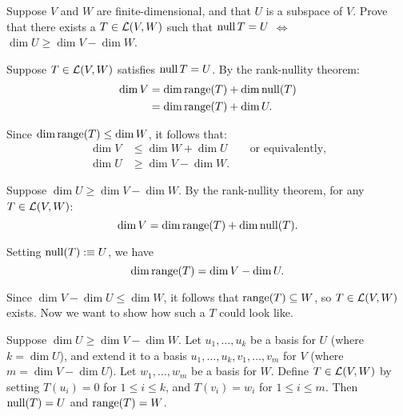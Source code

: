 \begin{xrcs}
  Suppose $V$ and $W$ are finite-dimensional, and that $U$ is a subspace of $V$. Prove that there exists a $T \in \mathcal{L}(V,W)$ such that $\operatorname{null} T = U$ $\iff$ $\dim U \geq \dim V - \dim W$.

  \begin{xprf}
    \Rightarrowdirection Suppose $T \in \mathcal{L}(V,W)$ satisfies $\operatorname{null} T = U$. By the rank-nullity theorem:
    \begin{equation}
      \begin{aligned}
        \dim V &= \dim \operatorname{range}(T) + \dim \operatorname{null}(T) \\
        &= \dim \operatorname{range}(T) + \dim U.
      \end{aligned}
    \end{equation}

    Since $\dim \operatorname{range}(T) \leq \dim W$, it follows that:
    \begin{equation}
      \begin{aligned}
        \dim V &\leq \dim W + \dim U \qquad \text{or equivalently,}  \\
        \dim U &\geq \dim V - \dim W.
      \end{aligned}
    \end{equation}

    \Leftarrowdirection Suppose $\dim U \geq \dim V - \dim W$. By the rank-nullity theorem, for any $T \in \mathcal{L}(V,W)$:
    \begin{equation}
      \dim V = \dim \operatorname{range}(T) + \dim \operatorname{null}(T).
    \end{equation}

    Setting $\operatorname{null}(T) :\equiv U$, we have
    \begin{equation}
      \dim \operatorname{range}(T) = \dim V - \dim U.
    \end{equation}

    Since $\dim V - \dim U \leq \dim W$, it follows that $\operatorname{range}(T) \subseteq W$, so $T \in \mathcal{L} (V,W)$ exists. Now we want to show how such a $T$ could look like.

    Suppose $\dim U \geq \dim V - \dim W$. Let $u_1, \dots, u_k$ be a basis for $U$ (where $k = \dim U$), and extend it to a basis $u_1, \dots, u_k, v_1, \dots, v_m$ for $V$ (where $m = \dim V - \dim U$). Let $w_1, \dots, w_m$ be a basis for $W$. Define $T \in \mathcal{L}(V,W)$ by setting $T(u_i) = 0$ for $1 \leq i \leq k$, and $T(v_i) = w_i$ for $1 \leq i \leq m$. Then $\operatorname{null}(T) = U$ and $\operatorname{range}(T) = W$.
  \end{xprf}
\end{xrcs}

